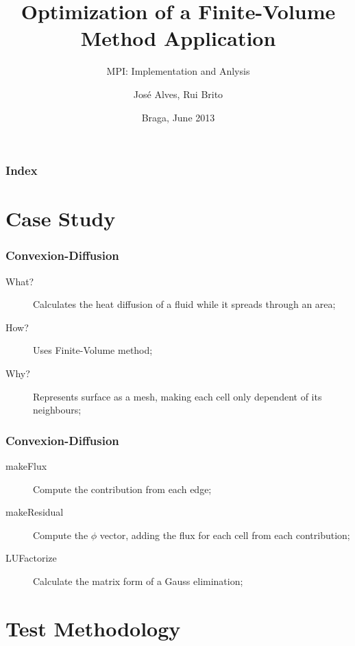 \documentclass{beamer}
\title{Optimization of a Finite-Volume Method Application}
\subtitle{MPI: Implementation and Anlysis}
\author{José Alves, Rui Brito}
\institute[22765, 22781]{
	Universidade do Minho
}
\date{Braga, June 2013}
\begin{document}

\maketitle%

\begin{frame}
	\frametitle{Index}
	\tableofcontents
\end{frame}

\section{Case Study}

\begin{frame}[plain]
	\frametitle{Convexion-Diffusion}
	\begin{description}
		\item [What?] Calculates the heat diffusion of a fluid while it spreads through an area;
		\item [How?] Uses Finite-Volume method;
		\item [Why?] Represents surface as a mesh, making each cell only dependent of its neighbours;
	\end{description}
\end{frame}

\begin{frame}[plain]
	\frametitle{Convexion-Diffusion}
	\begin{description}
		\item [makeFlux] Compute the contribution from each edge;
		\item [makeResidual] Compute the $\phi$ vector, adding the flux for each cell from each contribution;
		\item [LUFactorize] Calculate the matrix form of a Gauss elimination;
	\end{description}
\end{frame}


\section{Test Methodology}
\end{document}
